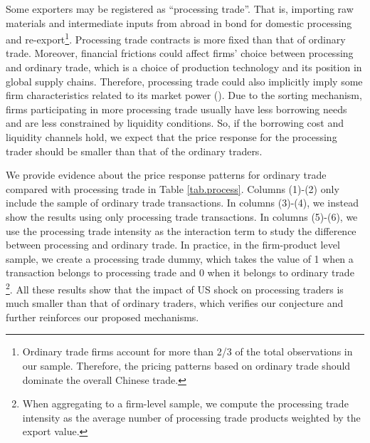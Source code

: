 Some exporters may be registered as ``processing trade''. That is, importing raw materials and intermediate inputs from abroad in bond for domestic processing and re-export\footnote{ Ordinary trade firms account for more than 2/3 of the total observations in our sample. Therefore, the pricing patterns based on ordinary trade should dominate the overall Chinese trade.}. Processing trade contracts is more fixed than that of ordinary trade. Moreover, financial frictions could affect firms' choice between processing and ordinary trade, which is a choice of production technology and its position in global supply chains. Therefore, processing trade could also implicitly imply some firm characteristics related to its market power (\cite{manova2016firms}). Due to the sorting mechanism, firms participating in more processing trade usually have less borrowing needs and are less constrained by liquidity conditions. So, if the borrowing cost and liquidity channels hold, we expect that the price response for the processing trader should be smaller than that of the ordinary traders. 

We provide evidence about the price response patterns for ordinary trade compared with processing trade in Table \ref{tab.process}. Columns (1)-(2) only include the sample of ordinary trade transactions. In columns (3)-(4), we instead show the results using only processing trade transactions. In columns (5)-(6), we use the processing trade intensity as the interaction term to study the difference between processing and ordinary trade. In practice, in the firm-product level sample, we create a processing trade dummy, which takes the value of 1 when a transaction belongs to processing trade and 0 when it belongs to ordinary trade \footnote{When aggregating to a firm-level sample, we compute the processing trade intensity as the average number of processing trade products weighted by the export value.}. All these results show that the impact of US shock on processing traders is much smaller than that of ordinary traders, which verifies our conjecture and further reinforces our proposed mechanisms.

